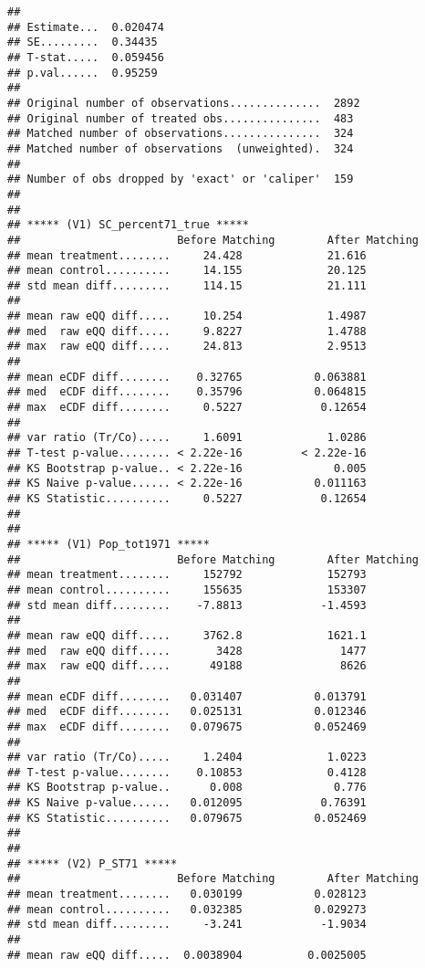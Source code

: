\documentclass[
]{article}
\begin{document}
\begin{verbatim}
## 
## Estimate...  0.020474 
## SE.........  0.34435 
## T-stat.....  0.059456 
## p.val......  0.95259 
## 
## Original number of observations..............  2892 
## Original number of treated obs...............  483 
## Matched number of observations...............  324 
## Matched number of observations  (unweighted).  324 
## 
## Number of obs dropped by 'exact' or 'caliper'  159 
## 
## 
## ***** (V1) SC_percent71_true *****
##                        Before Matching        After Matching
## mean treatment........     24.428             21.616 
## mean control..........     14.155             20.125 
## std mean diff.........     114.15             21.111 
## 
## mean raw eQQ diff.....     10.254             1.4987 
## med  raw eQQ diff.....     9.8227             1.4788 
## max  raw eQQ diff.....     24.813             2.9513 
## 
## mean eCDF diff........    0.32765           0.063881 
## med  eCDF diff........    0.35796           0.064815 
## max  eCDF diff........     0.5227            0.12654 
## 
## var ratio (Tr/Co).....     1.6091             1.0286 
## T-test p-value........ < 2.22e-16         < 2.22e-16 
## KS Bootstrap p-value.. < 2.22e-16              0.005 
## KS Naive p-value...... < 2.22e-16           0.011163 
## KS Statistic..........     0.5227            0.12654 
## 
## 
## ***** (V1) Pop_tot1971 *****
##                        Before Matching        After Matching
## mean treatment........     152792             152793 
## mean control..........     155635             153307 
## std mean diff.........    -7.8813            -1.4593 
## 
## mean raw eQQ diff.....     3762.8             1621.1 
## med  raw eQQ diff.....       3428               1477 
## max  raw eQQ diff.....      49188               8626 
## 
## mean eCDF diff........   0.031407           0.013791 
## med  eCDF diff........   0.025131           0.012346 
## max  eCDF diff........   0.079675           0.052469 
## 
## var ratio (Tr/Co).....     1.2404             1.0223 
## T-test p-value........    0.10853             0.4128 
## KS Bootstrap p-value..      0.008              0.776 
## KS Naive p-value......   0.012095            0.76391 
## KS Statistic..........   0.079675           0.052469 
## 
## 
## ***** (V2) P_ST71 *****
##                        Before Matching        After Matching
## mean treatment........   0.030199           0.028123 
## mean control..........   0.032385           0.029273 
## std mean diff.........     -3.241            -1.9034 
## 
## mean raw eQQ diff.....  0.0038904          0.0025005 

\end{verbatim}
\end{document}
